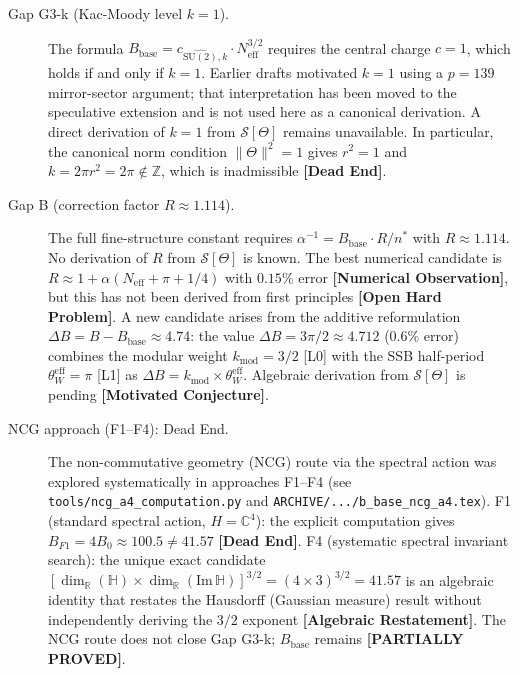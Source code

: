 \documentclass[11pt,a4paper]{article}
\theoremstyle{definition}
\theoremstyle{remark}
\newcommand{\PARTIAL}{\textbf{[PARTIALLY PROVED]}}
\begin{document}
\begin{description}
  \item[Gap G3-k (Kac-Moody level $k=1$).]
    The formula $B_{\mathrm{base}} = c_{\widehat{\mathrm{SU}(2)},k} \cdot N_{\mathrm{eff}}^{3/2}$
    requires the central charge $c = 1$, which holds if and only if $k = 1$.
    Earlier drafts motivated $k=1$ using a $p=139$ mirror-sector argument; that
    interpretation has been moved to the speculative extension and is not used
    here as a canonical derivation.  A direct derivation of $k = 1$ from
    $\mathcal{S}[\Theta]$ remains unavailable. In particular, the canonical
    norm condition $\|\Theta\|^2 = 1$ gives $r^2 = 1$ and
    $k = 2\pi r^2 = 2\pi \notin \mathbb{Z}$, which is inadmissible
    \textbf{[Dead End]}.

  \item[Gap B (correction factor $R \approx 1.114$).]
    The full fine-structure constant requires $\alpha^{-1} = B_{\mathrm{base}} \cdot R / n^*$
    with $R \approx 1.114$. No derivation of $R$ from $\mathcal{S}[\Theta]$ is known.
    The best numerical candidate is $R \approx 1 + \alpha(N_{\mathrm{eff}} + \pi + 1/4)$
    with $0.15\%$ error \textbf{[Numerical Observation]}, but this has not been
    derived from first principles \textbf{[Open Hard Problem]}.
    A new candidate arises from the additive reformulation $\Delta B = B - B_{\mathrm{base}}
    \approx 4.74$: the value $\Delta B = 3\pi/2 \approx 4.712$ ($0.6\%$ error) combines
    the modular weight $k_{\mathrm{mod}} = 3/2$ [L0] with the SSB half-period
    $\theta_W^{\mathrm{eff}} = \pi$ [L1] as $\Delta B = k_{\mathrm{mod}} \times \theta_W^{\mathrm{eff}}$.
    Algebraic derivation from $\mathcal{S}[\Theta]$ is pending
    \textbf{[Motivated Conjecture]}.

  \item[NCG approach (F1--F4): Dead End.]
    The non-commutative geometry (NCG) route via the spectral action was explored
    systematically in approaches F1--F4 (see \texttt{tools/ncg\_a4\_computation.py}
    and \texttt{ARCHIVE/.../b\_base\_ncg\_a4.tex}).
    F1 (standard spectral action, $H = \mathbb{C}^4$): the explicit computation
    gives $B_{F1} = 4 B_0 \approx 100.5 \neq 41.57$ \textbf{[Dead End]}.
    F4 (systematic spectral invariant search): the unique exact candidate
    $[\dim_\mathbb{R}(\mathbb{H}) \times \dim_\mathbb{R}(\mathrm{Im}\,\mathbb{H})]^{3/2}
    = (4 \times 3)^{3/2} = 41.57$ is an algebraic identity that restates the
    Hausdorff (Gaussian measure) result without independently deriving the
    $3/2$ exponent \textbf{[Algebraic Restatement]}.
    The NCG route does not close Gap G3-k;
    $B_{\mathrm{base}}$ remains \PARTIAL.
\end{description}
\end{document}

